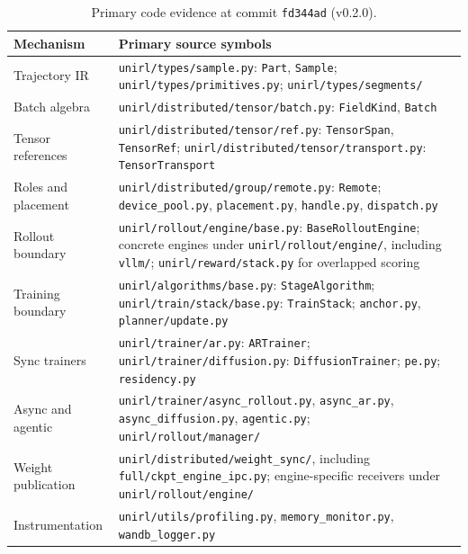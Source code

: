\documentclass[10pt]{article}
\newcommand{\codepath}[1]{\texttt{#1}}
\begin{document}
\begin{table}[H]
\caption{Primary code evidence at commit \texttt{fd344ad} (v0.2.0).}
\label{tab:source-audit}
\centering
\scriptsize
\begin{tabularx}{\textwidth}{@{}L{0.20\textwidth}Y@{}}
\toprule
Mechanism & Primary source symbols \\
\midrule
Trajectory IR & \codepath{unirl/types/sample.py}: \texttt{Part}, \texttt{Sample}; \codepath{unirl/types/primitives.py}; \codepath{unirl/types/segments/} \\
Batch algebra & \codepath{unirl/distributed/tensor/batch.py}: \texttt{FieldKind}, \texttt{Batch} \\
Tensor references & \codepath{unirl/distributed/tensor/ref.py}: \texttt{TensorSpan}, \texttt{TensorRef}; \codepath{unirl/distributed/tensor/transport.py}: \texttt{TensorTransport} \\
Roles and placement & \codepath{unirl/distributed/group/remote.py}: \texttt{Remote}; \codepath{device\_pool.py}, \codepath{placement.py}, \codepath{handle.py}, \codepath{dispatch.py} \\
Rollout boundary & \codepath{unirl/rollout/engine/base.py}: \texttt{BaseRolloutEngine}; concrete engines under \codepath{unirl/rollout/engine/}, including \codepath{vllm/}; \codepath{unirl/reward/stack.py} for overlapped scoring \\
Training boundary & \codepath{unirl/algorithms/base.py}: \texttt{StageAlgorithm}; \codepath{unirl/train/stack/base.py}: \texttt{TrainStack}; \codepath{anchor.py}, \codepath{planner/update.py} \\
Sync trainers & \codepath{unirl/trainer/ar.py}: \texttt{ARTrainer}; \codepath{unirl/trainer/diffusion.py}: \texttt{DiffusionTrainer}; \codepath{pe.py}; \codepath{residency.py} \\
Async and agentic & \codepath{unirl/trainer/async\_rollout.py}, \codepath{async\_ar.py}, \codepath{async\_diffusion.py}, \codepath{agentic.py}; \codepath{unirl/rollout/manager/} \\
Weight publication & \codepath{unirl/distributed/weight\_sync/}, including \codepath{full/ckpt\_engine\_ipc.py}; engine-specific receivers under \codepath{unirl/rollout/engine/} \\
Instrumentation & \codepath{unirl/utils/profiling.py}, \codepath{memory\_monitor.py}, \codepath{wandb\_logger.py} \\
\bottomrule
\end{tabularx}
\end{table}
\end{document}
